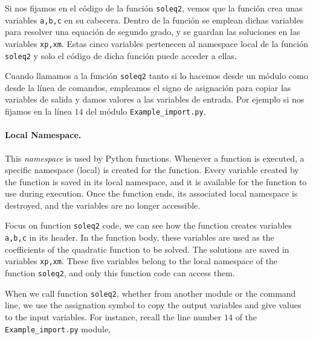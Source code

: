 \begin{paracol}{2}
Si nos fijamos en el código de la función \texttt{soleq2}, vemos que la función crea unas variables \texttt{a,b,c} en su cabecera. Dentro de la función se emplean dichas variables para resolver una equación de segundo grado, y se guardan las soluciones en las variables \texttt{xp,xm}. Estas cinco variables pertenecen al namespace local de la función \texttt{soleq2} y solo el código de dicha función puede acceder a ellas.

Cuando llamamos a la función \texttt{soleq2} tanto si lo hacemos desde un módulo como desde la línea de comandos, empleamos el signo de asignación para copiar las variables de salida y damos valores a las variables de entrada. Por ejemplo si nos fijamos en la línea $14$ del módulo \texttt{Example_import.py},
\switchcolumn
\paragraph{Local Namespace.} This \emph{namespace} is used by Python functions. Whenever a function is executed, a specific namespace (local) is created for the function. Every variable created by the function is saved in its local namespace, and it is available for the function to use during execution. Once the function ends, its associated local namespace is destroyed, and the variables are no longer accessible.

Focus on function \texttt{soleq2} code, we can see how the function creates variables \texttt{a,b,c} in its header. In the function body, these variables are used as the coefficients of the quadratic function to be solved. The solutions are saved in variables \texttt{xp,xm}. These five variables belong to the local namespace of the function \texttt{soleq2}, and only this function code can access them. 

When we call function \texttt{soleq2}, whether from another module or the command line, we use the assignation symbol to copy the output variables and give values to the input variables. For instance, recall the line number $14$ of the \texttt{Example_import.py} module,
\end{paracol}
